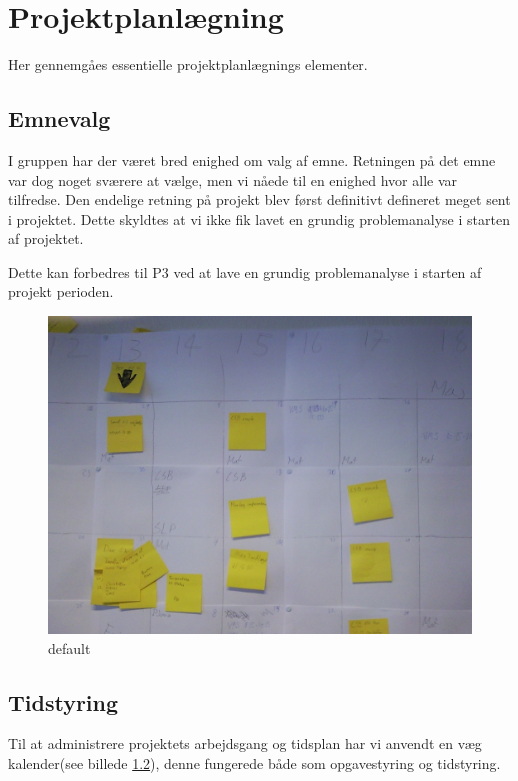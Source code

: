 \section{Projektplanl\ae{}gning}
Her gennemg\aa{}es essentielle projektplanl\ae{}gnings elementer. 

\subsection{Emnevalg}
I gruppen har der v\ae{}ret bred enighed om valg af emne. Retningen p\aa{} det emne var dog noget sv\ae{}rere at v\ae{}lge, men vi n\aa{}ede til en enighed hvor alle var tilfredse. 
Den endelige retning p\aa{} projekt blev f\o{}rst definitivt defineret meget sent i projektet.
Dette skyldtes at vi ikke fik lavet en grundig problemanalyse i starten af projektet.

Dette kan forbedres til P3 ved at lave en grundig problemanalyse i starten af projekt perioden. 

\begin{figure}[htbp]
\begin{center}
\includegraphics[width=\textwidth]{Billede0075.jpg}
\caption{default}
\label{default}
\end{center}
\end{figure}


\subsection{Tidstyring}
Til at administrere projektets arbejdsgang og tidsplan har vi anvendt en v\ae{}g kalender(see billede \ref{}), denne fungerede b\aa{}de som opgavestyring og tidstyring. 

